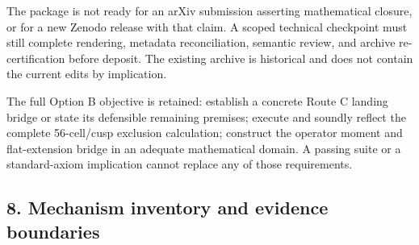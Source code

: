 \documentclass[
]{article}
\begin{document}
The package is not ready for an arXiv submission asserting mathematical
closure, or for a new Zenodo release with that claim. A scoped technical
checkpoint must still complete rendering, metadata reconciliation,
semantic review, and archive re-certification before deposit. The
existing archive is historical and does not contain the current edits by
implication.

The full Option B objective is retained: establish a concrete Route C
landing bridge or state its defensible remaining premises; execute and
soundly reflect the complete 56-cell/cusp exclusion calculation;
construct the operator moment and flat-extension bridge in an adequate
mathematical domain. A passing suite or a standard-axiom implication
cannot replace any of those requirements.

\subsection{8. Mechanism inventory and evidence
boundaries}\label{mechanism-inventory-and-evidence-boundaries}
\end{document}
